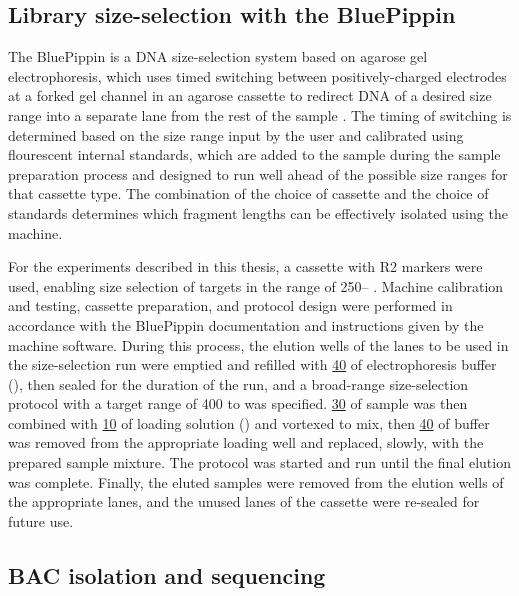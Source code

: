 
\subsection{Library size-selection with the BluePippin}
\label{sec:methods_molec_standard_bluepippin}


The BluePippin is a DNA size-selection system based on agarose gel electrophoresis, which uses timed switching between positively-charged electrodes at a forked gel channel in an agarose cassette to redirect DNA of a desired size range into a separate lane from the rest of the sample \parencite{sage2016bluepippin}. The timing of switching is determined based on the size range input by the user and calibrated using flourescent internal standards, which are added to the sample during the sample preparation process and designed to run well ahead of the possible size ranges for that cassette type. The combination of the choice of cassette and the choice of standards determines which fragment lengths can be effectively isolated using the machine.

For the experiments described in this thesis, a  cassette with R2 markers were used, enabling size selection of targets in the range of 250-- \parencite{sage2016bluepippin}. Machine calibration and testing, cassette preparation, and protocol design were performed in accordance with the BluePippin documentation and instructions given by the machine software. During this process, the elution wells of the lanes to be used in the size-selection run were emptied and refilled with \ul{40} of electrophoresis buffer (), then sealed for the duration of the run, and a broad-range size-selection protocol with a target range of 400 to  was specified. \ul{30} of sample was then combined with \ul{10} of loading solution () and vortexed to mix, then \ul{40} of buffer was removed from the appropriate loading well and replaced, slowly, with the prepared sample mixture. The protocol was started and run until the final elution was complete. Finally, the eluted samples were removed from the elution wells of the appropriate lanes, and the unused lanes of the cassette were re-sealed for future use.

\subsection{BAC isolation and sequencing}
\label{sec:methods_molec_bacs}

